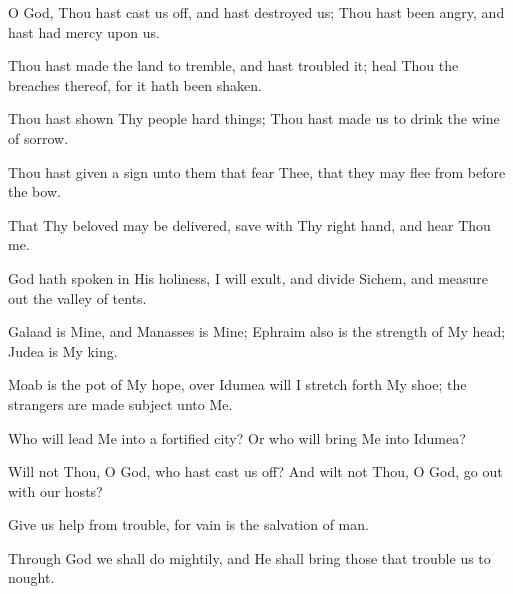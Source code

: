 O God, Thou hast cast us off, and hast destroyed us; Thou hast been angry, and hast had mercy upon us.

Thou hast made the land to tremble, and hast troubled it; heal Thou the breaches thereof, for it hath been shaken.

Thou hast shown Thy people hard things; Thou hast made us to drink the wine of sorrow.

Thou hast given a sign unto them that fear Thee, that they may flee from before the bow.

That Thy beloved may be delivered, save with Thy right hand, and hear Thou me.

God hath spoken in His holiness, I will exult, and divide Sichem, and measure out the valley of tents.

Galaad is Mine, and Manasses is Mine; Ephraim also is the strength of My head; Judea is My king.

Moab is the pot of My hope, over Idumea will I stretch forth My shoe; the strangers are made subject unto Me.

Who will lead Me into a fortified city? Or who will bring Me into Idumea?

Will not Thou, O God, who hast cast us off? And wilt not Thou, O God, go out with our hosts?

Give us help from trouble, for vain is the salvation of man.

Through God we shall do mightily, and He shall bring those that trouble us to nought.
